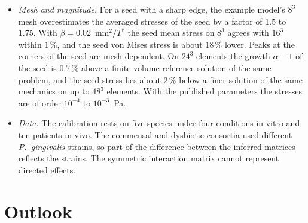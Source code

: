 \begin{itemize}
        (Appendix~\ref{app:klempt2024}), and the paper gives two forms of the
        law for $\alpha$. I follow its Eq.~36.
  \item \emph{Mesh and magnitude.} For a seed with a sharp edge, the example
        model's $8^3$ mesh overestimates the averaged stresses of the seed by a
        factor of 1.5 to 1.75. With $\beta=0.02$~mm$^2/T^*$ the seed mean stress
        on $8^3$ agrees with $16^3$ within $1\,\%$, and the seed von Mises stress
        is about $18\,\%$ lower. Peaks at the corners of the seed are mesh
        dependent. On $24^3$ elements the growth $\alpha-1$ of
        the seed is $0.7\,\%$ above a finite-volume reference solution of the same
        problem, and the seed stress lies about $2\,\%$ below a finer solution of
        the same mechanics on up to $48^3$ elements. With the published parameters the stresses
        are of order $10^{-4}$ to $10^{-3}$~Pa.
  \item \emph{Data.} The calibration rests on five species under four
        conditions in vitro and ten patients in vivo. The commensal and
        dysbiotic consortia used different \textit{P.~gingivalis} strains, so
        part of the difference between the inferred matrices reflects the
        strains. The symmetric interaction matrix cannot represent directed
        effects.
\end{itemize}

\section{Outlook}
\label{sec:concl_outlook}

